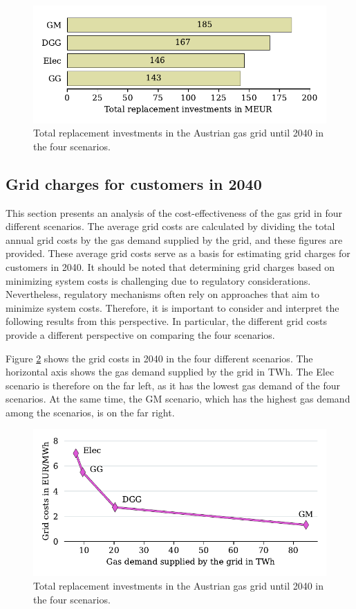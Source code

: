\begin{figure}[h]
	\centering
	\includegraphics[width=0.8\linewidth]{figures/results/total_replacement_inv/replace_inv_2040.pdf}
	\caption{Total replacement investments in the Austrian gas grid until 2040 in the four scenarios.}
	\label{fig_grid_repl_inv}
\end{figure}

\subsection{Grid charges for customers in 2040}\label{res_grid_charges}
This section presents an analysis of the cost-effectiveness of the gas grid in four different scenarios. The average grid costs are calculated by dividing the total annual grid costs by the gas demand supplied by the grid, and these figures are provided. These average grid costs serve as a basis for estimating grid charges for customers in 2040. It should be noted that determining grid charges based on minimizing system costs is challenging due to regulatory considerations. Nevertheless, regulatory mechanisms often rely on approaches that aim to minimize system costs. Therefore, it is important to consider and interpret the following results from this perspective. In particular, the different grid costs provide a different perspective on comparing the four scenarios.\vspace{0.3cm}

Figure \ref{fig_grid_charges} shows the grid costs in 2040 in the four different scenarios. The horizontal axis shows the gas demand supplied by the grid in TWh. The Elec scenario is therefore on the far left, as it has the lowest gas demand of the four scenarios. At the same time, the GM scenario, which has the highest gas demand among the scenarios, is on the far right. 

\begin{figure}[h]
	\centering
	\includegraphics[width=1\linewidth]{figures/results/grid_charges/grid_charges.pdf}
	\caption{Total replacement investments in the Austrian gas grid until 2040 in the four scenarios.}
	\label{fig_grid_charges}
\end{figure}


